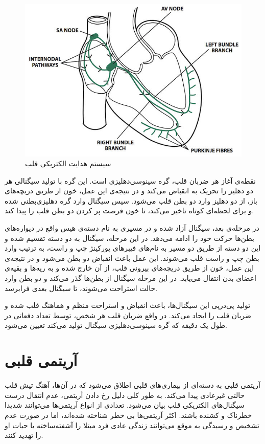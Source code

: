 \begin{figure}
\centering
\includegraphics[width=12cm]{Figures/conduction.jpg}
\caption{سیستم هدایت الکتریکی قلب\cite{Medicalexamprep}}
\label{fig:conduction}
\end{figure}

نقطه‌ی آغاز هر ضربان قلب، گره سینوسی‌دهلیزی است. این گره با تولید سیگنالی هر دو دهلیز را تحریک به انقباض می‌کند و در نتیجه‌ی این عمل، خون از طریق دریچه‌های باز، از دو دهلیز وارد دو بطن قلب می‌شود. سپس سیگنال وارد گره دهلیزی‌بطنی شده و برای لحظه‌ای کوتاه تاخیر می‌کند، تا خون فرصت پر کردن دو بطن قلب را پیدا کند. 

در مرحله‌ی بعد، سیگنال آزاد شده و در مسیری به نام دسته‌ی هیس واقع در دیواره‌های بطن‌ها حرکت خود را ادامه می‌دهد. در این مرحله، سیگنال به دو دسته تقسیم شده و این دو دسته از طریق دو مسیر به نام‌های فیبرهای پورکینژ چپ و راست، به ترتیب وارد بطن چپ و راست قلب می‌شوند. این عمل باعث انقباض دو بطن می‌شود و در نتیجه‌ی این عمل، خون از طریق دریچه‌های بیرونی قلب، از آن خارج شده و به ریه‌ها و بقیه‌ی اعضای بدن انتقال می‌یابد. در این مرحله سیگنال از بطن‌ها گذر می‌کند و دو بطن وارد حالت استراحت می‌شوند، تا سیگنال بعدی فرابرسد.

تولید پی‌در‌پی این سیگنال‌ها، باعث انقباض و استراحت منظم و هماهنگ قلب شده و ضربان قلب را ایجاد می‌کند. در واقع ضربان قلب هر شخص، توسط تعداد دفعاتی در طول یک دقیقه که گره سینوسی‌دهلیزی سیگنال تولید می‌کند تعیین می‌شود. \cite{Heart} 


\section{آریتمی قلبی}
آریتمی قلبی به دسته‌ای از بیماری‌های قلبی اطلاق می‌شود که در آن‌ها، آهنگ تپش قلب حالتی غیرعادی پیدا می‌کند. به طور کلی دلیل رخ دادن آریتمی، عدم انتقال درست سیگنال‌های الکتریکی قلب بیان می‌شود. تعدادی از انواع آریتمی‌ها می‌توانند شدیدا خطرناک و کشنده باشند. اکثر آریتمی‌ها بی خطر شناخته شده‌اند، اما در صورت عدم تشخیص و رسیدگی به موقع می‌توانند زندگی عادی فرد مبتلا را آشفته‌ساخته یا حیات او را تهدید کنند. 
